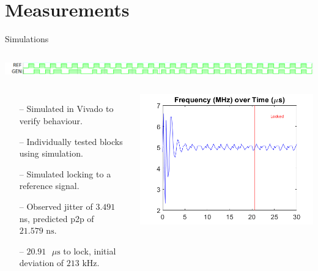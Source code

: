 \documentclass{beamer}
\begin{document}
\section*{Measurements}
\begin{frame}{Simulations}
	\begin{columns}
		\vspace*{-10mm}
		\hspace{10mm}
		\begin{flushleft}
 		\includegraphics[scale=0.4]{../vivado_sim}
 	\end{flushleft}
 \end{columns}
	\begin{columns}
    \begin{itemize}
	    \item[--]
	        Simulated in Vivado to verify behaviour.
	    \item[--]
	        Individually tested blocks using simulation.
	    \item[--]
	        Simulated locking to a reference signal.
	    \item[--]
            Observed jitter of $3.491$ ns, predicted p2p of $21.579\textrm{ ns}$.
	    \item[--]
            $20.91\textrm{ }\mu\textrm{s}$ to lock, initial deviation of $213\textrm{ kHz}$.
	\end{itemize}
	
    \begin{flushleft}
    	\includegraphics[scale=0.45]{../sim_locking}
    \end{flushleft}
	
	\end{columns}

\end{frame}
\end{document}
